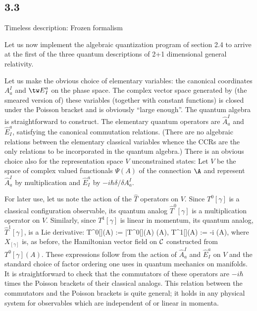 \goodbreak
\subsection{3.3}{Timeless description: Frozen formalism}%

Let us now implement the algebraic quantization program of section 2.4 to
arrive at the first of the three quantum descriptions of 2+1 dimensional
general relativity.

Let us make the obvious choice of elementary variables: the canonical
coordinates $A_a^I$ and ${\tw E}^a_I$ on the phase space. The complex
vector space generated by (the  smeared version of) these variables
(together with constant functions) is closed under the Poisson bracket
and is obviously ``large enough''. The quantum algebra is straightforward
to construct. The elementary quantum operators are ${\hat A}_a^I$ and
${\hat E}^a_I$, satisfying the canonical commutation relations. (There
are no algebraic relations between the elementary classical variables
whence the CCRs are the only relations to be incorporated in the quantum
algebra.) There is an obvious choice also for the  representation space $V$
unconstrained states: Let $V$ be the space of complex valued functionals
$\Psi (A)$ of the connection $\A$ and represent $\hat{A}_a^I$ by multiplication
and $\hat{E}^a_I$ by $-i\hbar {\delta/\delta A_a^I}$.

For later use, let us note the action of the $\hat{T}$ operators on $V$.
Since ${T}^0[\gamma ]$ is a classical configuration observable, its quantum
analog ${\hat T}^0[\gamma ]$ is a multiplication operator on $V$. Similarly,
since ${T}^1[\gamma ]$ is linear in momentum, its quantum analog, ${\hat T}^1
[\gamma ]$, is a Lie derivative:
\bneq
{\hat T}^0[\gamma ]\cdot\Psi ({A}) := \bar{T}^0[\gamma]({A})
 \cdot\Psi ({A}),  \quad
 {\hat T}^1[\gamma ]\cdot\Psi ({A}) := -i\hbar{} \Psi
 ({A}),
where $X_{[\gamma]}$ is, as before, the Hamiltonian vector field on ${\cal C}$
constructed from $T^0[\gamma] (A)$. These expressions follow from the action
of $\hat{A}_a^I$ and $\hat{E}^a_I$ on $V$ and the standard choice of
factor ordering one uses in quantum mechanics on manifolds. It is
straightforward to check that the commutators of these operators are
$-i\hbar$ times the Poisson brackets of their classical analogs. This relation
between the commutators and the Poisson brackets is quite general; it holds
in any physical system for observables which are independent of or linear in
momenta.

